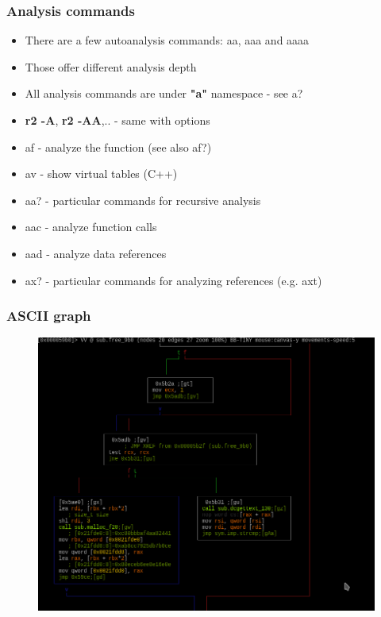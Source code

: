 \documentclass[10pt,pdf,utf8,english,compress,hyperref={unicode}]{beamer}
\begin{document}
\begin{frame}[fragile]
  \frametitle{Analysis commands}
  \begin{itemize}
	  \item There are a few autoanalysis commands: aa, aaa and aaaa
	  \item Those offer different analysis depth
	  \item All analysis commands are under \textbf{"a"} namespace - see \alert{a?}
	  \item \textbf{r2 -A}, \textbf{r2 -AA},.. - same with options
	  \item \alert{af} - analyze the function (see also \alert{af?})
	  \item \alert{av} - show virtual tables (C++)
	  \item \alert{aa?} - particular commands for recursive analysis
	  \item \alert{aac} - analyze function calls
	  \item \alert{aad} - analyze data references
	  \item \alert{ax?} - particular commands for analyzing references (e.g. \alert{axt})
  \end{itemize}
\end{frame}

\begin{frame}[fragile]
	\frametitle{ASCII graph}
	\begin{figure}
		\includegraphics[width=\linewidth]{r2asciigraph.png}
	\end{figure}
\end{frame}
\end{document}
